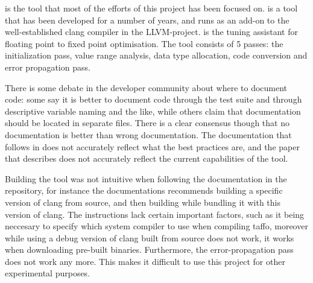 \taffo{} is the tool that most of the efforts of this project has been focused on. \taffo{} is a tool that has been developed for a number of years, and runs as an add-on to the well-established clang compiler in the LLVM-project.
\taffo{} is the tuning assistant for floating point to fixed point optimisation. The tool consists of 5 passes: the initialization pass, value range analysis, data type allocation, code conversion and error propagation pass.

There is some debate in the developer community about where to document code: some say it is better to document code through the test suite and through descriptive variable naming and the like, while others claim that documentation should be located in separate files. There is a clear consensus though that no documentation is better than wrong documentation.
The documentation that follows in \taffo{} does not accurately reflect what the best practices are, and the paper that describes \taffo{} does not accurately reflect the current capabilities of the tool.

Building the tool was not intuitive when following the documentation in the repository, for instance the documentations recommends building a specific version of clang from source, and then building \taffo{} while bundling it with this version of clang. The instructions lack certain important factors, such as it being neccesary to specify which system compiler to use when compiling taffo, moreover while using a debug version of clang built from source does not work, it works when downloading pre-built binaries.
Furthermore, the error-propagation pass does not work any more. This makes it difficult to use this project for other experimental purposes.

